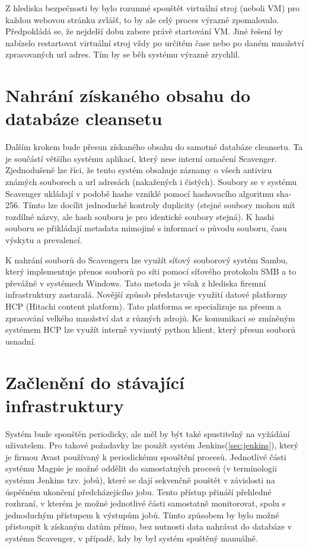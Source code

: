 \documentclass[thesis=M,czech,hidelinks]{FITthesis}[2013/05/06]
\begin{document}
Z hlediska bezpečnosti by bylo rozumné spouštět virtuální stroj (neboli VM) pro každou webovou stránku zvlášť, to by ale celý proces výrazně zpomalovalo. Předpokládá se, že nejdelší dobu zabere právě startování VM.  Jiné řešení by nabízelo restartovat virtuální stroj vždy po určitém čase nebo po daném množství zpracovaných url adres. Tím by se běh systému výrazně zrychlil.





\section{Nahrání získaného obsahu do databáze cleansetu}
Dalším krokem bude přesun získaného obsahu do samotné databáze cleansetu. Ta je součástí většího systému aplikací, který nese interní označení Scavenger. Zjednodušeně lze říci, že tento systém obsahuje záznamy o všech antiviru známých souborech a url adresách (nakažených i čistých). Soubory se v systému Scavenger ukládají v podobě hashe vzniklé pomocí hashovacího algoritmu sha-256. Tímto lze docílit jednoduché kontroly duplicity (stejné soubory mohou mít rozdílné názvy, ale hash souboru je pro identické soubory stejná). K hashi souboru se přikládají metadata mimojiné s informací o původu souboru, času výskytu a prevalencí. 

K nahrání souborů do Scavengeru lze využít síťový souborový systém Sambu, který implementuje přenos souborů po síti pomocí síťového protokolu SMB a to převážně v systémech Windows. Tato metoda je však z hlediska firemní infrastruktury zastaralá. Novější způsob představuje využití datové platformy HCP (Hitachi content platform). Tato platforma se specializuje na přesun a zpracování velkého množství dat z různých zdrojů. Ke komunikaci se zmíněným systémem HCP lze využít interně vyvinutý python klient, který přesun souborů usnadní.





\section{Začlenění do stávající infrastruktury}
Systém bude spouštěn periodicky, ale měl by být také spustitelný na vyžádání uživatelem. Pro takové požadavky lze použít systém Jenkins(\ref{sec:jenkins}), který je firmou Avast používaný k periodickému spouštění procesů. Jednotlivé části systému Magpie je možné oddělit do samostatných procesů (v terminologii systému Jenkins tzv. jobů), které se dají sekvenčně pouštět v závislosti na úspěšném ukončení předcházejícího jobu. Tento přístup přináší přehledné rozhraní, v kterém je možné jednotlivé části samostatně monitorovat, spolu s jednoduchým přístupem k výstupům jobů. Tímto způsobem by bylo možné přistoupit k získaným datům přímo, bez nutnosti data nahrávat do databáze v systému Scavenger, v případě, kdy by byl systém spuštěný manuálně.
\end{document}
